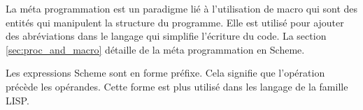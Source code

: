 
La méta programmation est un paradigme lié à l'utilisation de macro qui sont
des entités qui manipulent la structure du programme. Elle est utilisé pour
ajouter des abréviations dans le langage qui simplifie l'écriture du code.  La
section \ref{sec:proc_and_macro} détaille de la méta programmation en Scheme.

Les expressions Scheme sont en forme préfixe. Cela signifie que l'opération
précède les opérandes. Cette forme est plus utilisé dans les langage de la famille
LISP.





